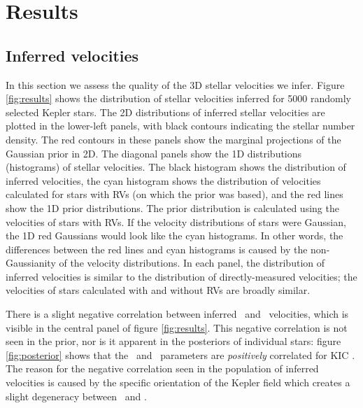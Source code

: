 \section{Results}
\label{sec:results}

\subsection{Inferred velocities}

In this section we assess the quality of the 3D stellar velocities we infer.
Figure \ref{fig:results} shows the distribution of stellar velocities inferred
for 5000 randomly selected Kepler stars.
The 2D distributions of inferred stellar velocities are plotted in the
lower-left panels, with black contours indicating the stellar number density.
The red contours in these panels show the marginal projections of the
Gaussian prior in 2D.
The diagonal panels show the 1D distributions (histograms) of stellar
velocities.
The black histogram shows the distribution of inferred velocities, the cyan
histogram shows the distribution of velocities calculated for stars with RVs
(on which the prior was based), and the red lines show the 1D prior
distributions.
The prior distribution is calculated using the velocities of stars with RVs.
If the velocity distributions of stars were Gaussian, the 1D red Gaussians
would look like the cyan histograms.
In other words, the differences between the red lines and cyan histograms
is caused by the non-Gaussianity of the velocity distributions.
In each panel, the distribution of inferred velocities is similar to the
distribution of directly-measured velocities; the velocities of stars
calculated with and without RVs are broadly similar.

There is a slight negative correlation between inferred \vy\ and \vz\
velocities, which is visible in the central panel of figure \ref{fig:results}.
This negative correlation is not seen in the prior, nor is it apparent in the
posteriors of individual stars: figure \ref{fig:posterior} shows that the \vy\
and \vz\ parameters are {\it positively} correlated for KIC \kicstar.
The reason for the negative correlation seen in the population of inferred
velocities is caused by the specific orientation of the Kepler field which
creates a slight degeneracy between \vy\ and \vz.

